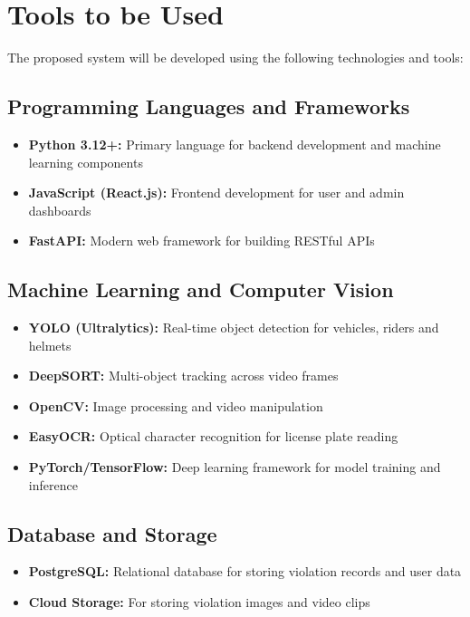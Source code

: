 \documentclass[12pt, a4paper, oneside]{memoir}
\begin{document}
\newpage

\section{Tools to be Used}

The proposed system will be developed using the following technologies and tools:

\subsection{Programming Languages and Frameworks}
\begin{itemize}
    \item \textbf{Python 3.12+:} Primary language for backend development and machine learning components
    \item \textbf{JavaScript (React.js):} Frontend development for user and admin dashboards
    \item \textbf{FastAPI:} Modern web framework for building RESTful APIs
\end{itemize}

\subsection{Machine Learning and Computer Vision}
\begin{itemize}
    \item \textbf{YOLO (Ultralytics):} Real-time object detection for vehicles, riders and helmets
    \item \textbf{DeepSORT:} Multi-object tracking across video frames
    \item \textbf{OpenCV:} Image processing and video manipulation
    \item \textbf{EasyOCR:} Optical character recognition for license plate reading
    \item \textbf{PyTorch/TensorFlow:} Deep learning framework for model training and inference
\end{itemize}

\subsection{Database and Storage}
\begin{itemize}
    \item \textbf{PostgreSQL:} Relational database for storing violation records and user data
    \item \textbf{Cloud Storage:} For storing violation images and video clips
\end{itemize}
\end{document}
